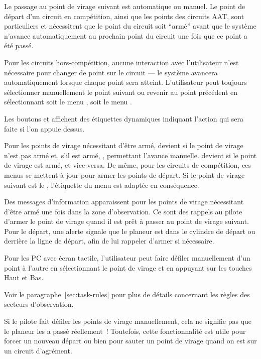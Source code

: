 Le passage au point de virage suivant est automatique ou manuel.
Le point de départ d'un circuit en compétition, ainsi que les points des circuits AAT, sont particuliers et nécessitent
que le point du circuit soit ``armé'' avant que le système n'avance automatiquement au prochain point du circuit une fois que ce point a été passé.

Pour les circuits hors-compétition, aucune interaction avec l'utilisateur n'est nécessaire pour
changer de point sur le circuit --- le système avancera automatiquement lorsque
chaque point sera atteint. L'utilisateur peut toujours sélectionner manuellement le point suivant ou revenir au point
précédent en sélectionnant soit le menu \blink{}, soit le menu \blink{}.

Les boutons  et 
affichent des étiquettes dynamiques indiquant l'action qui sera faite si l'on appuie dessus.

Pour les points de virage nécessitant d'être armé,  devient 
 si le point de virage n'est pas armé et,
s'il est armé,
, permettant l'avance manuelle.
 devient  si le point de virage est armé,
et vice-versa. De même, pour les circuits de compétition, ces menus se mettent à jour pour armer
les points de départ. Si le point de virage suivant est le , l'étiquette
du menu est adaptée en conséquence.


Des messages d'information apparaissent pour les points de virage nécessitant d'être armé une fois
dans la zone d'observation. Ce sont des rappels au pilote d'armer le point de virage quand il est prêt à passer au point de virage suivant. Pour le départ, une
alerte signale que le planeur est dans le cylindre de départ ou derrière la ligne de départ, afin de lui rappeler d'armer si nécessaire.

Pour les PC avec écran tactile, l'utilisateur peut
faire défiler manuellement d'un point à l'autre en sélectionnant le point de virage
 et en appuyant sur les touches Haut et Bas.

Voir le paragraphe~\ref{sec:task-rules} pour plus de détails concernant les règles des secteurs d'observation.

Si le pilote fait défiler les points de virage manuellement, cela ne signifie pas
que le planeur les a passé réellement~! Toutefois, cette
fonctionnalité est utile pour forcer un nouveau départ ou bien pour sauter un point de virage quand
on est sur un circuit d'agrément.

